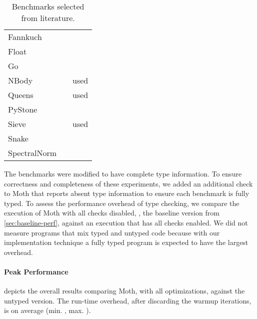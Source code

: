 \begin{table}[htb]
  \caption{Benchmarks selected from literature.}
  \label{tab:gradual-benchmarks}
  \begin{center}
    \begin{tabular}{l l r}
      Fannkuch & \cite{Vitousek2017,Greenman2018} \\
      Float & \cite{Vitousek2017,Muehlboeck2017,Greenman2018} \\
      Go & \cite{Vitousek2017,Muehlboeck2017,Greenman2018} \\
      NBody & \cite{Kuhlenschmidt:2018:preprint,Vitousek2017,Greenman2018} & used \cite{Marr2016} \\
      Queens & \cite{Vitousek2017,Muehlboeck2017,Greenman2018} & used \cite{Marr2016} \\
      PyStone & \cite{Vitousek2017,Muehlboeck2017,Greenman2018} \\
      Sieve & \cite{Takikawa2016,Muehlboeck2017,Bauman2017,Richards2017,Greenman2019jfp} & used \cite{Marr2016} \\
      Snake & \cite{Takikawa2016,Muehlboeck2017,Bauman2017,Richards2017,Greenman2019jfp} \\
      SpectralNorm & \cite{Vitousek2017,Muehlboeck2017,Greenman2018} \\
    \end{tabular}
  \end{center}
\end{table}

The benchmarks were modified to have complete type information.
To ensure correctness and completeness of these experiments,
we added an additional check to Moth that
reports absent type information to ensure each benchmark is fully typed.
To assess the performance overhead of type checking,
we compare the execution of Moth with all checks disabled, \ie, the baseline version from
\cref{sec:baseline-perf}, against an execution that has all checks enabled.
We did not measure programs that mix typed and untyped code
because with our implementation technique a fully typed program is expected to
have the largest overhead.

\paragraph*{Peak Performance}

 depicts
the overall results comparing Moth,
with all optimizations,
against the untyped version.
The run-time overhead,
after discarding the warmup iterations,
is on average
\OverheadTypingGMeanP (min. \OverheadTypingMinP, max. \OverheadTypingMaxP).

